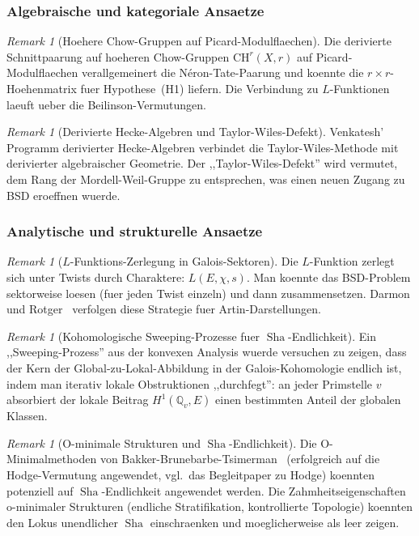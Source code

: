 \documentclass[aps,prd,twocolumn,superscriptaddress,nofootinbib]{revtex4-2}
\theoremstyle{definition}
\theoremstyle{remark}
\newtheorem{remark}[theorem]{Remark}
\DeclareMathOperator{\Sha}{Sha}
\begin{document}
\subsubsection{Algebraische und kategoriale Ansaetze}

\begin{remark}[Hoehere Chow-Gruppen auf Picard-Modulflaechen]
\label{rem:chow-groups}
Die derivierte Schnittpaarung auf hoeheren Chow-Gruppen $\mathrm{CH}^r(X, r)$ auf Picard-Modulflaechen verallgemeinert die N\'eron-Tate-Paarung und koennte die $r \times r$-Hoehenmatrix fuer Hypothese~(H1) liefern. Die Verbindung zu $L$-Funktionen laeuft ueber die Beilinson-Vermutungen.
\end{remark}

\begin{remark}[Derivierte Hecke-Algebren und Taylor-Wiles-Defekt]
\label{rem:derived-hecke}
Venkatesh' Programm derivierter Hecke-Algebren verbindet die Taylor-Wiles-Methode mit derivierter algebraischer Geometrie. Der ,,Taylor-Wiles-Defekt'' wird vermutet, dem Rang der Mordell-Weil-Gruppe zu entsprechen, was einen neuen Zugang zu BSD eroeffnen wuerde.
\end{remark}

\subsubsection{Analytische und strukturelle Ansaetze}

\begin{remark}[$L$-Funktions-Zerlegung in Galois-Sektoren]
\label{rem:galois-sectors}
Die $L$-Funktion zerlegt sich unter Twists durch Charaktere: $L(E, \chi, s)$. Man koennte das BSD-Problem sektorweise loesen (fuer jeden Twist einzeln) und dann zusammensetzen. Darmon und Rotger~\cite{DarmonRotger2017} verfolgen diese Strategie fuer Artin-Darstellungen.
\end{remark}

\begin{remark}[Kohomologische Sweeping-Prozesse fuer $\Sha$-Endlichkeit]
\label{rem:sweeping-sha}
Ein ,,Sweeping-Prozess'' aus der konvexen Analysis wuerde versuchen zu zeigen, dass der Kern der Global-zu-Lokal-Abbildung in der Galois-Kohomologie endlich ist, indem man iterativ lokale Obstruktionen ,,durchfegt'': an jeder Primstelle $v$ absorbiert der lokale Beitrag $H^1(\mathbb{Q}_v, E)$ einen bestimmten Anteil der globalen Klassen.
\end{remark}

\begin{remark}[O-minimale Strukturen und $\Sha$-Endlichkeit]
\label{rem:o-minimal-sha}
Die O-Minimalmethoden von Bakker-Brunebarbe-Tsimerman~\cite{BBT2020} (erfolgreich auf die Hodge-Vermutung angewendet, vgl.\ das Begleitpaper zu Hodge) koennten potenziell auf $\Sha$-Endlichkeit angewendet werden. Die Zahmheitseigenschaften o-minimaler Strukturen (endliche Stratifikation, kontrollierte Topologie) koennten den Lokus unendlicher $\Sha$ einschraenken und moeglicherweise als leer zeigen.
\end{remark}
\end{document}
